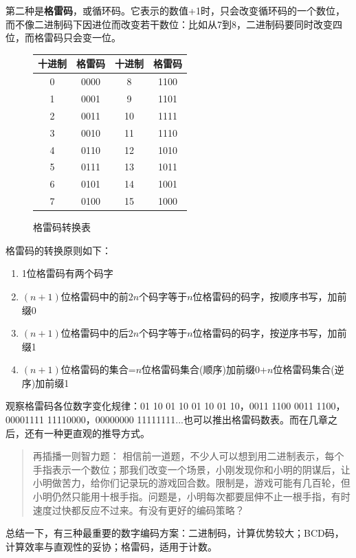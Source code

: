 \documentclass[UTF8]{ctexart}
\begin{document}
第二种是\textbf{格雷码}，或循环码。它表示的数值+1时，只会改变循环码的一个数位，而不像二进制码下因进位而改变若干数位：比如从7到8，二进制码要同时改变四位，而格雷码只会变一位。

\begin{figure}
    \begin{tabular}{|c|c|c|c|}\hline\rowcolor{lightgray}
        十进制 & 格雷码 & 十进制 & 格雷码\\\hline
        0&0000&8 &1100\\\hline
        1&0001&9 &1101\\\hline
        2&0011&10&1111\\\hline
        3&0010&11&1110\\\hline
        4&0110&12&1010\\\hline
        5&0111&13&1011\\\hline
        6&0101&14&1001\\\hline
        7&0100&15&1000\\\hline
    \end{tabular}
    \caption*{格雷码转换表}
\end{figure}
格雷码的转换原则如下：

\begin{enumerate}
\item 1位格雷码有两个码字
\item $(n+1)$位格雷码中的前$2n$个码字等于$n$位格雷码的码字，按顺序书写，加前缀0
\item $(n+1)$位格雷码中的后$2n$个码字等于$n$位格雷码的码字，按逆序书写，加前缀1
\item $(n+1)$位格雷码的集合=$n$位格雷码集合(顺序)加前缀0+$n$位格雷码集合(逆序)加前缀1\cite{3}
\end{enumerate}

观察格雷码各位数字变化规律：01 10 01 10 01 10 01 10，0011 1100 0011 1100，00001111 11110000，00000000 11111111...也可以推出格雷码数表。而在几章之后，还有一种更直观的推导方式。

\begin{quote}
再插播一则智力题：
相信前一道题，不少人可以想到用二进制表示，每个手指表示一个数位；那我们改变一个场景，小刚发现你和小明的阴谋后，让小明做苦力，给你们记录玩的游戏回合数。限制是，游戏可能有几百轮，但小明仍然只能用十根手指。问题是，小明每次都要屈伸不止一根手指，有时速度过快都反应不过来。有没有更好的编码策略？
\end{quote}

总结一下，有三种最重要的数字编码方案：二进制码，计算优势较大；BCD码，计算效率与直观性的妥协；格雷码，适用于计数。
\end{document}
